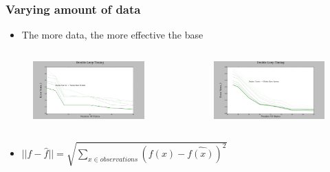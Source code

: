 \documentclass{beamer}
\begin{document}

\begin{frame}
\frametitle{Varying amount of data}

\begin{itemize}
\item The more data, the more effective the base

\end{itemize}


\begin{columns}[c]

\begin{figure}
\includegraphics[width=1.0\linewidth]{lucasplots/monImages/DoubleLoopTiming0.png}
\end{figure}


\begin{figure}
\includegraphics[width=1.0\linewidth]{lucasplots/monImages/DoubleLoopTiming0_1.png}
\end{figure}

\end{columns}

\begin{itemize}


\item $||f - \hat{f}|| = \sqrt{\sum\nolimits_{x \in observations}(f(x) - \hat{f(x)})^2}$ 
\end{itemize}


\end{frame}
\end{document}

